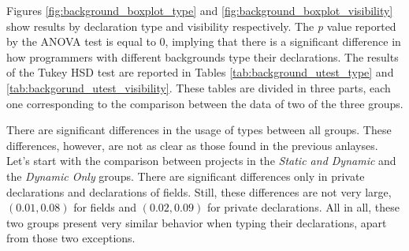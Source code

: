 \documentclass[msc]{ppgccufmg}
\begin{document}
Figures \ref{fig:background_boxplot_type} and \ref{fig:background_boxplot_visibility}  show results by declaration type and visibility respectively.
The \emph{p} value reported by the ANOVA test is equal to 0, implying that there is a significant difference in how programmers with different backgrounds type their declarations.
The results of the Tukey HSD test are reported in Tables \ref{tab:background_utest_type} and \ref{tab:backgorund_utest_visibility}.
These tables are divided in three parts, each one corresponding to the comparison between the data of two of the three groups.

There are significant differences in the usage of types between all groups.
These differences, however, are not as clear as those found in the previous anlayses.
Let's start with the comparison between projects in the \emph{Static and Dynamic} and the \emph{Dynamic Only} groups.
There are significant differences only in private declarations and declarations of fields.
Still, these differences are not very large, $(0.01,0.08)$ for fields and $(0.02,0.09)$ for private declarations.
All in all, these two groups present very similar behavior when typing their declarations, apart from those two exceptions.
\end{document}
